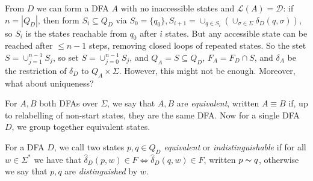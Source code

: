 \documentclass[10pt,a4paper]{article}
\begin{document}
From $D$ we can form a DFA $A$ with no inaccessible states and $\mathcal{L}(A) = \mathcal{D}$: if $n = |Q_D|$, then form $S_i \subseteq Q_D$ via $S_0 = \{q_0\}, S_{i+1} = \cup_{q \in S_i} (\cup_{\sigma \in \Sigma} \delta_D(q, \sigma))$, so $S_i$ is the states reachable from $q_0$ after $i$ states. But any accessible state can be reached after $\leq n-1$ steps, removing closed loops of repeated states. So the stet $S = \cup_{j=1}^{n-1}S_j$, so set $S = \cup_{j=0}^{n-1} S_j$, and $Q_A = S \subseteq Q_D$, $F_A = F_D \cap S$, and $\delta_A$ be the restriction of $\delta_D$ to $Q_A \times \Sigma$. However, this might not be enough. Moreover, what about uniqueness?

For $A, B$ both DFAs over $\Sigma$, we say that $A, B$ are \emph{equivalent}, written $A\equiv B$ if, up to relabelling of non-start states, they are the same DFA. Now for a single DFA $D$, we group together equivalent states.

For a DFA $D$, we call two states $p,q \in Q_D$ \emph{equivalent} or \emph{indistinguishable} if for all $w \in \Sigma^{\ast}$ we have that $\hat{\delta}_D(p,w) \in F \iff \hat{\delta}_D(q,w) \in F$, written $p \thicksim q$, otherwise we say that $p,q$ are \emph{distinguished} by $w$.
\end{document}
